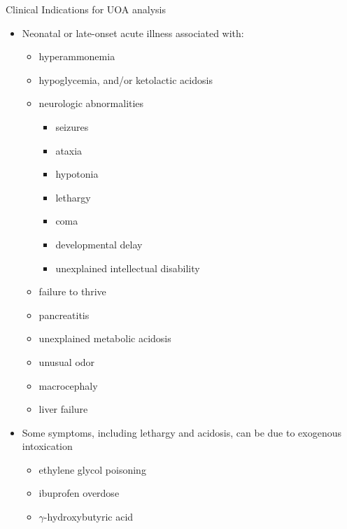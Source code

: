 \documentclass[presentation, smaller]{beamer}
\begin{document}
\begin{frame}[label={sec:orga0521b7}]{Clinical Indications for UOA analysis}
\begin{itemize}
\item Neonatal or late-onset acute illness associated with:
\begin{itemize}
\item hyperammonemia
\item hypoglycemia, and/or ketolactic acidosis
\item neurologic abnormalities
\begin{itemize}
\item seizures
\item ataxia
\item hypotonia
\item lethargy
\item coma
\item developmental delay
\item unexplained intellectual disability
\end{itemize}
\item failure to thrive
\item pancreatitis
\item unexplained metabolic acidosis
\item unusual odor
\item macrocephaly
\item liver failure
\end{itemize}
\item Some symptoms, including lethargy and acidosis, can be due to exogenous intoxication
\begin{itemize}
\item ethylene glycol poisoning
\item ibuprofen overdose
\item \(\gamma\)-hydroxybutyric acid
\end{itemize}
\end{itemize}
\end{frame}
\end{document}
